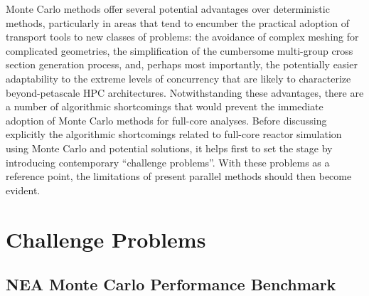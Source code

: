 Monte Carlo methods offer several potential advantages over deterministic
methods, particularly in areas that tend to encumber the practical adoption of
transport tools to new classes of problems: the avoidance of complex meshing for
complicated geometries, the simplification of the cumbersome multi-group cross
section generation process, and, perhaps most importantly, the potentially
easier adaptability to the extreme levels of concurrency that are likely to
characterize beyond-petascale HPC architectures. Notwithstanding these
advantages, there are a number of algorithmic shortcomings that would prevent
the immediate adoption of Monte Carlo methods for full-core analyses. Before
discussing explicitly the algorithmic shortcomings related to full-core reactor
simulation using Monte Carlo and potential solutions, it helps first to set the
stage by introducing contemporary ``challenge problems''. With these problems as
a reference point, the limitations of present parallel methods should then
become evident.

\section{Challenge Problems}

\subsection{NEA Monte Carlo Performance Benchmark}

